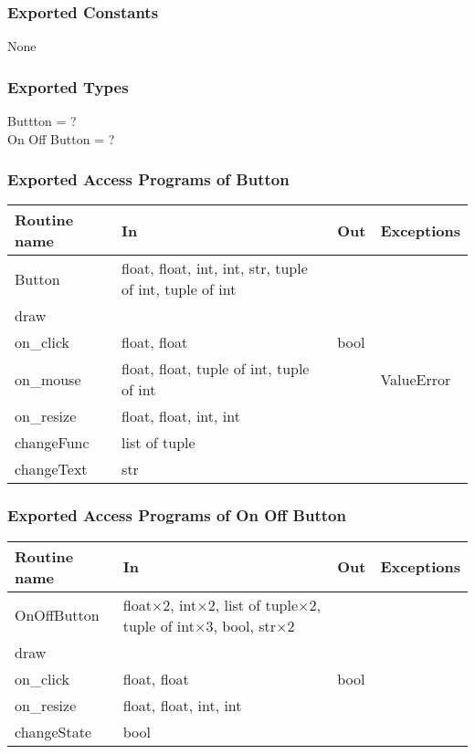 \documentclass{article}
\begin{document}
\subsubsection {Exported Constants}
None

\subsubsection {Exported Types}
Buttton = ?\\
On Off Button = ?

\subsubsection {Exported Access Programs of Button}
\begin{table}[!htbp]
\begin{tabular}{| l | l | l | l |}
\hline
\textbf{Routine name} & \textbf{In} & \textbf{Out} & \textbf{Exceptions}\\
\hline
Button & float, float, int, int, str, tuple of int, tuple of int & ~ & ~\\
\hline
draw & ~ & ~ & ~\\
\hline
on\_click & float, float & bool & ~\\
\hline
on\_mouse & float, float, tuple of int, tuple of int & ~ & ValueError\\
\hline
on\_resize & float, float, int, int & ~ & ~\\
\hline
changeFunc & list of tuple & ~ & ~\\
\hline
changeText & str & ~ & ~\\
\hline
\end{tabular}
\end{table}
\subsubsection {Exported Access Programs of On Off Button}
\begin{table}[!htbp]
\begin{tabular}{| l | l | l | l |}
\hline
\textbf{Routine name} & \textbf{In} & \textbf{Out} & \textbf{Exceptions}\\
\hline
OnOffButton & float$\times2$, int$\times2$, list of tuple$\times2$, tuple of int$\times3$, bool, str$\times2$ & ~ & ~\\
\hline
draw & ~ & ~ & ~\\
\hline
on\_click & float, float & bool & ~\\
\hline
on\_resize & float, float, int, int & ~ & ~\\
\hline
changeState & bool & ~ & ~\\
\hline
\end{tabular}

\end{table}
\FloatBarrier
\FloatBarrier
\end{document}
